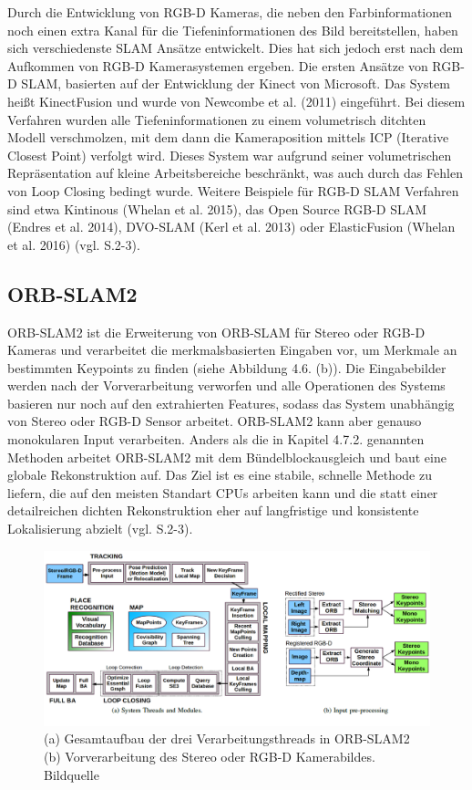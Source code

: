 Durch die Entwicklung von RGB-D Kameras, die neben den Farbinformationen noch einen extra Kanal für die Tiefeninformationen des Bild bereitstellen, haben sich verschiedenste SLAM Ansätze entwickelt. Dies hat sich jedoch erst nach dem Aufkommen von RGB-D Kamerasystemen ergeben. Die ersten Ansätze von RGB-D SLAM, basierten auf der Entwicklung der Kinect von Microsoft. Das System heißt KinectFusion und wurde von Newcombe et al. (2011) eingeführt. Bei diesem Verfahren wurden alle Tiefeninformationen zu einem volumetrisch ditchten Modell verschmolzen, mit dem dann die Kameraposition mittels ICP (Iterative Closest Point) verfolgt wird. Dieses System war aufgrund seiner volumetrischen Repräsentation auf kleine Arbeitsbereiche beschränkt, was auch durch das Fehlen von Loop Closing bedingt wurde. Weitere Beispiele für RGB-D SLAM Verfahren sind etwa \glqq Kintinous\grqq{} (Whelan et al. 2015), das Open Source RGB-D SLAM (Endres et al. 2014), \glqq DVO-SLAM\grqq{} (Kerl et al. 2013) oder \glqq ElasticFusion\grqq{} (Whelan et al. 2016) (vgl. \cite{orbslam2} S.2-3).

\subsection{ORB-SLAM2}

ORB-SLAM2 ist die Erweiterung von ORB-SLAM für Stereo oder RGB-D Kameras und verarbeitet die merkmalsbasierten Eingaben vor, um Merkmale an bestimmten Keypoints zu finden (siehe Abbildung 4.6. (b)). Die Eingabebilder werden nach der Vorverarbeitung verworfen und alle Operationen des Systems basieren nur noch auf den extrahierten Features, sodass das System unabhängig von Stereo oder RGB-D Sensor arbeitet. ORB-SLAM2 kann aber genauso monokularen Input verarbeiten. Anders als die in Kapitel 4.7.2. genannten Methoden arbeitet ORB-SLAM2 mit dem Bündelblockausgleich und baut eine globale Rekonstruktion auf. Das Ziel ist es eine stabile, schnelle Methode zu liefern, die auf den meisten Standart CPUs arbeiten kann und die statt einer detailreichen dichten Rekonstruktion eher auf langfristige und konsistente Lokalisierung abzielt (vgl. \cite{orbslam2} S.2-3).

\begin{figure}[H]
	\centering
	\includegraphics[scale=0.56]{orbslam2.png}
	\caption{(a) Gesamtaufbau der drei Verarbeitungsthreads in ORB-SLAM2 (b) Vorverarbeitung des Stereo oder RGB-D Kamerabildes. Bildquelle \cite{orbslam2}}
\end{figure}  




















